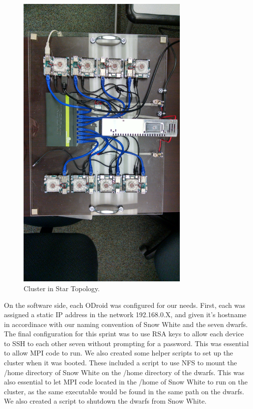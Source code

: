 \begin{figure}[tbh]
	\caption{Cluster in Star Topology.}
	\centering
		\includegraphics[width=0.75\textwidth]{IMG_20151201_104751350_HDR.jpg}
\end{figure}

On the software side, each ODroid was configured for our needs. First, each was assigned a static IP address in the network 192.168.0.X, and given it's hostname in accordinace with our naming convention of Snow White and the seven dwarfs. The final configuration for this sprint was to use RSA keys to allow each device to SSH to each other seven without prompting for a password. This was essential to allow MPI code to run. We also created some helper scripts to set up the cluster when it was booted. These included a script to use NFS to mount the /home directory of Snow White on the /home directory of the dwarfs. This was also essential to let MPI code located in the /home of Snow White to run on the cluster, as the same executable would be found in the same path on the dwarfs. We also created a script to shutdown the dwarfs from Snow White. 

